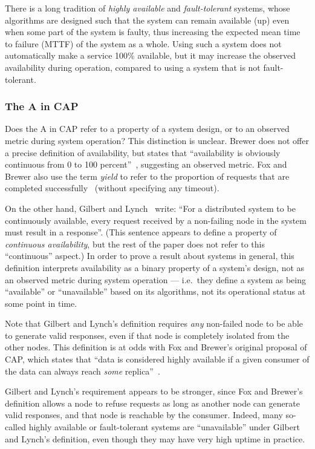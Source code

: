 \documentclass[a4paper,twocolumn,10pt]{article}
\begin{document}
There is a long tradition of \emph{highly available} and \emph{fault-tolerant} systems, whose
algorithms are designed such that the system can remain available (up) even when some part of the
system is faulty, thus increasing the expected mean time to failure (MTTF) of the system as a whole.
Using such a system does not automatically make a service 100\% available, but it may increase the
observed availability during operation, compared to using a system that is not fault-tolerant.

\subsubsection{The A in CAP}

Does the A in CAP refer to a property of a system design, or to an observed metric during system
operation? This distinction is unclear. Brewer does not offer a precise definition of availability,
but states that ``availability is obviously continuous from 0 to 100 percent''~\cite{Brewer2012ba},
suggesting an observed metric. Fox and Brewer also use the term \emph{yield} to refer to the
proportion of requests that are completed successfully~\cite{Fox1999bs} (without specifying any
timeout).

On the other hand, Gilbert and Lynch~\cite{Gilbert2002il} write: ``For a distributed system to be
continuously available, every request received by a non-failing node in the system must result in a
response''. (This sentence appears to define a property of \emph{continuous availability}, but the
rest of the paper does not refer to this ``continuous'' aspect.) In order to prove a result about
systems in general, this definition interprets availability as a binary property of a system's
design, not as an observed metric during system operation --- i.e.\ they define a system as being
``available'' or ``unavailable'' based on its algorithms, not its operational status at some point
in time.

Note that Gilbert and Lynch's definition requires \emph{any} non-failed node to be able to generate
valid responses, even if that node is completely isolated from the other nodes. This definition is
at odds with Fox and Brewer's original proposal of CAP, which states that ``data is considered
highly available if a given consumer of the data can always reach \emph{some}
replica''~\cite[emphasis original]{Fox1999bs}.

Gilbert and Lynch's requirement appears to be stronger, since Fox and Brewer's definition allows a
node to refuse requests as long as another node can generate valid responses, and that node is
reachable by the consumer. Indeed, many so-called highly available or fault-tolerant systems are
``unavailable'' under Gilbert and Lynch's definition, even though they may have very high uptime in
practice.
\end{document}
